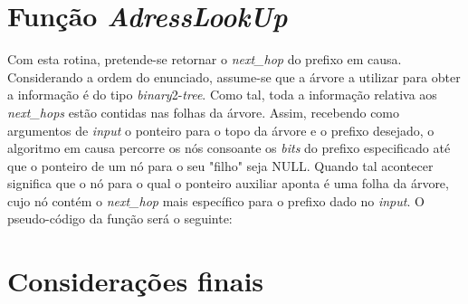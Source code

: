 \documentclass[twocolumn]{article}
\begin{document}
\section{Função \textit{AdressLookUp}}
Com esta rotina, pretende-se retornar o \textit{next\_hop} do prefixo em causa. Considerando a ordem do enunciado, assume-se que a árvore a utilizar para obter a informação é do tipo \textit{binary}2-\textit{tree}. Como tal, toda a informação relativa aos \textit{next\_hops} estão contidas nas folhas da árvore. Assim, recebendo como argumentos de \textit{input} o ponteiro para o topo da árvore e o prefixo desejado, o algoritmo em causa percorre os nós consoante os \textit{bits} do prefixo especificado até que o ponteiro de um nó para o seu "filho" seja NULL. Quando tal acontecer significa que o nó para o qual o ponteiro auxiliar aponta é uma folha da árvore, cujo nó contém o \textit{next\_hop} mais específico para o prefixo dado no \textit{input}.
O pseudo-código da função será o seguinte:
\begin{algorithmic}
 	\Return $-1\;$
 \EndIf
 
 \State $auxiliar:=root\;$
 
 		\If{$has\_no\_"0"\_child$}{
 			\Return $auxiliar \rightarrow next\_hop\;$
 		\EndIf
 		\State $auxiliar:=auxiliar \rightarrow zero\;$
 	\Else
 		\If{$has\_no\_"1"\_child$}
 			\Return $auxiliar \rightarrow next\_hop\;$
 		\EndIf
 		\State $auxiliar:=auxiliar \rightarrow one\;$
 	\EndIf
 \EndWhile
 
 \Return -1\;
 \caption{AdressLookUp}
\end{algorithmic}
\section{Considerações finais}
\end{document}
